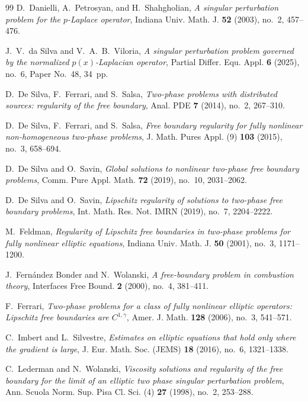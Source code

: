 \documentclass[11pt,letterpaper]{amsart}
\numberwithin{equation}{section}
\theoremstyle{definition}
\theoremstyle{remark}
\begin{document}
\begin{thebibliography}{99}
D.~Danielli, A.~Petrosyan, and H.~Shahgholian,
\emph{A singular perturbation problem for the $p$-Laplace operator},
Indiana Univ. Math. J. \textbf{52} (2003), no.~2, 457--476.

J.~V.~da Silva and V.~A.~B.~Viloria,
\emph{A singular perturbation problem governed by the normalized
$p(x)$-Laplacian operator},
Partial Differ. Equ. Appl. \textbf{6} (2025), no.~6,
Paper No.~48, 34~pp.

D.~De Silva, F.~Ferrari, and S.~Salsa,
\emph{Two-phase problems with distributed sources: regularity of the free
boundary},
Anal. PDE \textbf{7} (2014), no.~2, 267--310.

D.~De Silva, F.~Ferrari, and S.~Salsa,
\emph{Free boundary regularity for fully nonlinear non-homogeneous two-phase
problems},
J. Math. Pures Appl. (9) \textbf{103} (2015), no.~3, 658--694.

D.~De Silva and O.~Savin,
\emph{Global solutions to nonlinear two-phase free boundary problems},
Comm. Pure Appl. Math. \textbf{72} (2019), no.~10, 2031--2062.

D.~De Silva and O.~Savin,
\emph{Lipschitz regularity of solutions to two-phase free boundary problems},
Int. Math. Res. Not. IMRN (2019), no.~7, 2204--2222.

M.~Feldman,
\emph{Regularity of Lipschitz free boundaries in two-phase problems for fully
nonlinear elliptic equations},
Indiana Univ. Math. J. \textbf{50} (2001), no.~3, 1171--1200.

J.~Fern\'andez Bonder and N.~Wolanski,
\emph{A free-boundary problem in combustion theory},
Interfaces Free Bound. \textbf{2} (2000), no.~4, 381--411.

F.~Ferrari,
\emph{Two-phase problems for a class of fully nonlinear elliptic operators:
Lipschitz free boundaries are $C^{1,\gamma}$},
Amer. J. Math. \textbf{128} (2006), no.~3, 541--571.

C.~Imbert and L.~Silvestre,
\emph{Estimates on elliptic equations that hold only where the gradient is
large},
J. Eur. Math. Soc. (JEMS) \textbf{18} (2016), no.~6, 1321--1338.

C.~Lederman and N.~Wolanski,
\emph{Viscosity solutions and regularity of the free boundary for the limit of
an elliptic two phase singular perturbation problem},
Ann. Scuola Norm. Sup. Pisa Cl. Sci. (4)
\textbf{27} (1998), no.~2, 253--288.


\end{thebibliography}
\end{document}
